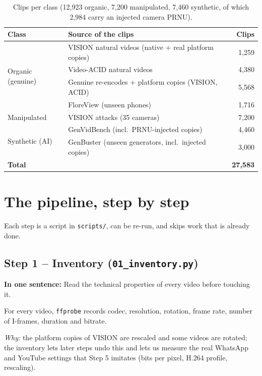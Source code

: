 \documentclass[11pt,a4paper]{article}
\newcommand{\say}[1]{\begin{onesentence}\small\textbf{In one sentence:} #1\end{onesentence}}
\newcommand{\why}[1]{\par\noindent\textit{Why:} #1\par}
\begin{document}
\begin{table}[H]\centering\small
\begin{tabular}{llr}\toprule
Class & Source of the clips & Clips \\\midrule
\multirow{4}{*}{Organic (genuine)} & VISION natural videos (native + real platform copies) & 1,259 \\
 & Video-ACID natural videos & 4,380 \\
 & Genuine re-encodes + platform copies (VISION, ACID) & 5,568 \\
 & FloreView (unseen phones) & 1,716 \\\midrule
Manipulated & VISION attacks (35 cameras) & 7,200 \\\midrule
\multirow{2}{*}{Synthetic (AI)} & GenVidBench (incl.\ PRNU-injected copies) & 4,460 \\
 & GenBuster (unseen generators, incl.\ injected copies) & 3,000 \\\midrule
\textbf{Total} & & \textbf{27,583} \\\bottomrule
\end{tabular}\caption{Clips per class (12,923 organic, 7,200 manipulated, 7,460 synthetic, of which 2,984 carry an injected
camera PRNU).}\label{tab:composition}\end{table}

\section{The pipeline, step by step}\label{sec:steps}
Each step is a script in \texttt{scripts/}, can be re-run, and skips work that is already done.

\subsection{Step 1 -- Inventory (\texttt{01\_inventory.py})}
\say{Read the technical properties of every video before touching it.}
For every video, \texttt{ffprobe} records codec, resolution, rotation, frame rate, number of I-frames, duration and bitrate.
\why{the platform copies of VISION are rescaled and some videos are rotated; the inventory lets later steps undo this and
lets us measure the real WhatsApp and YouTube settings that Step 5 imitates (bits per pixel, H.264 profile, rescaling).}
\end{document}
